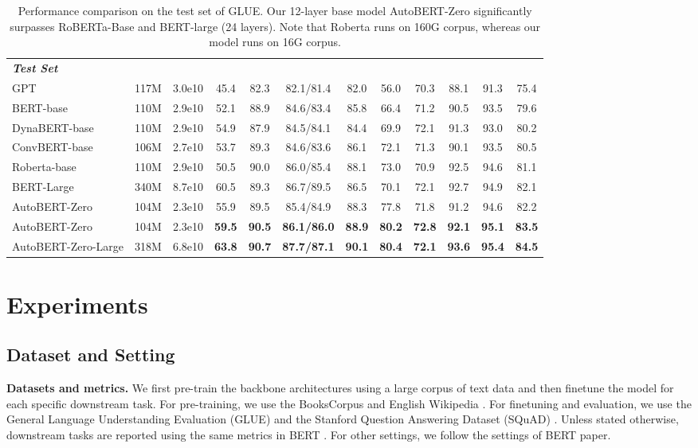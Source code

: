 \documentclass[letterpaper]{article} \usepackage{aaai22}  \usepackage{times}  \usepackage{helvet}  \usepackage{courier}  \usepackage[hyphens]{url}  \usepackage{graphicx} \urlstyle{rm} \def\UrlFont{\rm}  \usepackage{natbib}  \usepackage{caption} \DeclareCaptionStyle{ruled}{labelfont=normalfont,labelsep=colon,strut=off} \frenchspacing  \setlength{\pdfpagewidth}{8.5in}  \setlength{\pdfpageheight}{11in}  \usepackage{algorithm}
\begin{document}
\begin{table*}[t]
\begin{center}
{\begin{tabular}{lccccccccccc}
\hline
\hline
\multicolumn{12}{l}{\textbf{\textit{Test Set}}}
\tabularnewline
GPT\citep{radford2018improving} & 117M & 3.0e10 & 45.4 & 82.3 & 82.1/81.4 & 82.0 & 56.0 & 70.3 & 88.1 & 91.3 & 75.4 \tabularnewline
BERT-base\cite{devlin2019bert} & 110M  & 2.9e10 & 52.1  &88.9   & 84.6/83.4  & 85.8 &66.4 &71.2 & 90.5 &93.5&79.6 \tabularnewline
DynaBERT-base\cite{DBLP:conf/NeurIPS/HouHSJCL20} & 110M  & 2.9e10 & 54.9 & 87.9 &84.5/84.1 &84.4 &69.9 &{72.1} &{91.3} &93.0 & 80.2 \tabularnewline
ConvBERT-base \citep{jiang2020convbert} & 106M & 2.7e10  & 53.7 & 89.3 & 84.6/83.6 & 86.1 & 72.1 & 71.3 & 90.1 & 93.5 & 80.5 \tabularnewline
Roberta-base \citep{liu2019roberta} & 110M & 2.9e10 & 50.5 & 90.0 & 86.0/85.4 & 88.1 & 73.0 & 70.9 & 92.5 & 94.6 & 81.1 \tabularnewline
BERT-Large\cite{devlin2019bert} & 340M & 8.7e10 & 60.5 & 89.3 & 86.7/89.5 & 86.5 & 70.1 & 72.1 & 92.7 & 94.9 & 82.1 \tabularnewline
\hline
AutoBERT-Zero & 104M & 2.3e10 & {55.9} & {89.5} &{85.4/84.9} &{88.3} &{77.8} &71.8 &91.2& {94.6}  & {82.2} \tabularnewline
AutoBERT-Zero & 104M & 2.3e10 & \textbf{59.5} & \textbf{90.5} & \textbf{86.1/86.0} & \textbf{88.9} & \textbf{80.2} & \textbf{72.8} & \textbf{92.1} & \textbf{95.1} & \textbf{83.5} \tabularnewline
AutoBERT-Zero-Large & 318M & 6.8e10 & \textbf{63.8} & \textbf{90.7} & \textbf{87.7/87.1}  & \textbf{90.1} & \textbf{80.4} & \textbf{72.1} & \textbf{93.6} & \textbf{95.4} & \textbf{84.5} \tabularnewline
\hline
\end{tabular}
}
\caption{Performance comparison on the test set of GLUE.
Our 12-layer base model AutoBERT-Zero significantly surpasses RoBERTa-Base and BERT-large (24 layers). Note that Roberta \citep{liu2019roberta} runs on 160G corpus, whereas our model runs on 16G corpus. }\label{tab:compare_on_glue_test} \end{center}
\end{table*}


\vspace{-1mm}
\section{Experiments}\label{sec:experiments}
\subsection{Dataset and Setting}\label{sec:implementation}
\textbf{Datasets and metrics.} We first pre-train the backbone architectures using a large corpus of text data and then finetune the model for each specific downstream task. For pre-training, we use the BooksCorpus \citep{zhu2015aligning} and English Wikipedia \citep{devlin2019bert}.
For finetuning and evaluation, we use the General Language Understanding Evaluation (GLUE) \citep{wang2018glue}
and the Stanford Question Answering Dataset (SQuAD) \citep{rajpurkar-etal-2016-squad}.
Unless stated otherwise, downstream tasks  are reported using the same metrics in BERT \citep{devlin2019bert}.
For other settings, we follow the settings of BERT paper.
\end{document}
